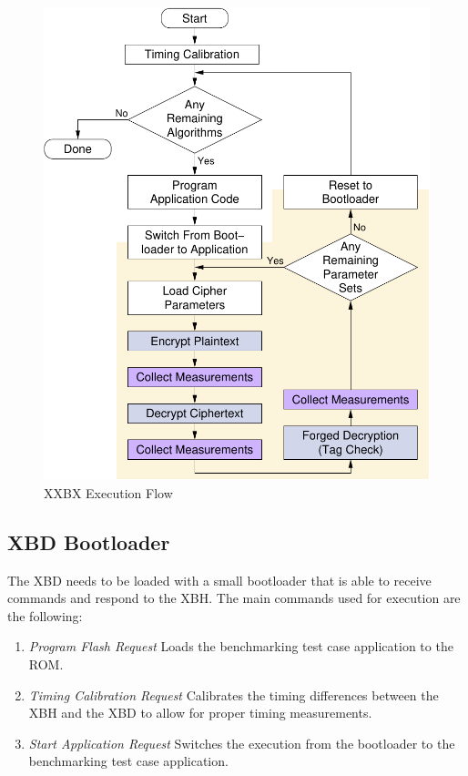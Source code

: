 \documentclass[10pt]{article}
\begin{document}
\begin{figure}[ht]
    \centering
    \includegraphics[scale=0.6]{../figures/xxbx_flow.pdf}
    \caption{XXBX Execution Flow}
    \label{fig:xxbx_flow}
\end{figure}


\subsection{XBD Bootloader}
The XBD needs to be loaded with a small bootloader that is able to receive commands 
and respond to the XBH. The main commands used for execution are the following:

\begin{enumerate}
  \item\emph{Program Flash Request}
     Loads the benchmarking test case application to the ROM.
  \item\emph{Timing Calibration Request}
     Calibrates the timing differences between the XBH and the XBD to allow for proper 
     timing measurements.
  \item\emph{Start Application Request}
     Switches the execution from the bootloader to the benchmarking test case application.
\end{enumerate}
\end{document}
